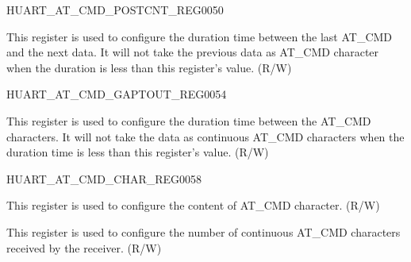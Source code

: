 \begin{register}{H}{UART\_AT\_CMD\_POSTCNT\_REG}{\hexprefix{}0050}\label{regdesc:UARTATCMDPOSTCNTREG}
%
%
\regnewline%
\begin{regdesc}\begin{reglist}
\label{fielddesc:UARTPOSTIDLENUM}\item [UART\_POST\_IDLE\_NUM] This register is used to configure the duration time between the last AT\_CMD and the next data.
It will not take the previous data as AT\_CMD character when the duration is less than this register's value. (R/W)
\end{reglist}\end{regdesc}
\end{register}


\begin{register}{H}{UART\_AT\_CMD\_GAPTOUT\_REG}{\hexprefix{}0054}\label{regdesc:UARTATCMDGAPTOUTREG}
%
%
\regnewline%
\begin{regdesc}\begin{reglist}
\label{fielddesc:UARTRXGAPTOUT}\item [UART\_RX\_GAP\_TOUT] This register is used to configure the duration time between the AT\_CMD characters.
It will not take the data as continuous AT\_CMD characters when the duration time is less than this register's value. (R/W)
\end{reglist}\end{regdesc}
\end{register}


\begin{register}{H}{UART\_AT\_CMD\_CHAR\_REG}{\hexprefix{}0058}\label{regdesc:UARTATCMDCHARREG}
%
%
%
\regnewline%
\begin{regdesc}\begin{reglist}
\label{fielddesc:UARTATCMDCHAR}\item [UART\_AT\_CMD\_CHAR] This register is used to configure the content of AT\_CMD character. (R/W)
\label{fielddesc:UARTCHARNUM}\item [UART\_CHAR\_NUM] This register is used to configure the number of continuous AT\_CMD characters received by the receiver. (R/W)
\end{reglist}\end{regdesc}
\end{register}



